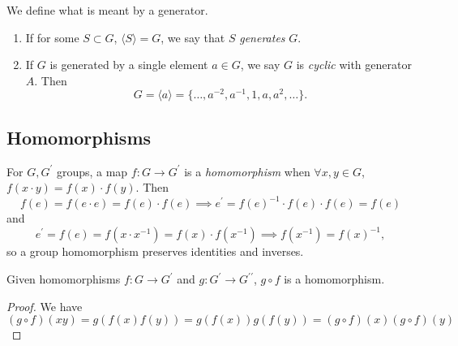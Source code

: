 \begin{defn}
  We define what is meant by a generator.
  \begin{enumerate}
    \item{If for some $S \subset G$, $\langle S \rangle = G$, we say that
          $S$ \emph{generates} $G$.
         }
    \item{If $G$ is generated by a single element $a \in G$, we say $G$ is
          \emph{cyclic} with generator $A$. Then
          $$
          G = \langle a \rangle = \{ \dots, a^{-2}, a^{-1}, 1, a, a^2, \dots \}.
          $$
         }
  \end{enumerate}
\end{defn}

\subsection{Homomorphisms}

\begin{defn}
For $G, G^\prime$ groups, a map $f : G \to G^\prime$ is a \emph{homomorphism}
when $\forall x, y \in G$, $f(x \cdot y) = f(x) \cdot f(y)$. Then
$$
f(e) = f(e \cdot e) = f(e) \cdot f(e)
\implies e^\prime = f(e)^{-1} \cdot f(e) \cdot f(e) = f(e)
$$
and
$$
e^\prime = f(e) = f(x \cdot x^{-1}) = f(x) \cdot f(x^{-1})
\implies f(x^{-1}) = f(x)^{-1},
$$
so a group homomorphism preserves identities and inverses.
\end{defn}

\begin{prop}
Given homomorphisms $f : G \to G^\prime$
and $g : G^\prime \to G^{\prime\prime}$,
$g \circ f$ is a homomorphism.
\end{prop}

\begin{proof}
We have
$$
(g \circ f)(xy) = g(f(x)f(y))
                = g(f(x))g(f(y))
                = (g \circ f)(x) (g \circ f)(y)
$$
\end{proof}

